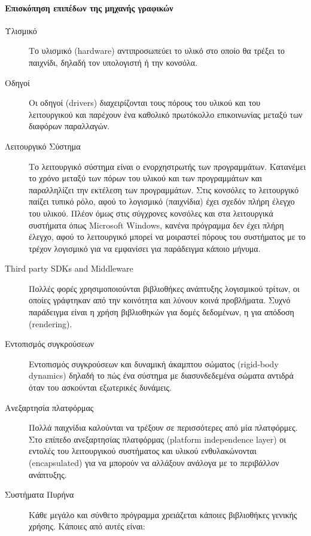 \paragraph{Επισκόπηση επιπέδων της μηχανής γραφικών}
\begin{description}	
\item [Υλισμικό]Το υλισμικό (hardware) αντιπροσωπεύει το υλικό στο οποίο θα τρέξει το παιχνίδι, δηλαδή τον υπολογιστή ή την κονσόλα.

\item [Οδηγοί]Οι οδηγοί (drivers) διαχειρίζονται τους πόρους του υλικού και του λειτουργικού και παρέχουν ένα καθολικό πρωτόκολλο επικοινωνίας μεταξύ των διαφόρων παραλλαγών.

\item [Λειτουργικό Σύστημα]Το λειτουργικό σύστημα είναι ο ενορχηστρωτής των προγραμμάτων. Κατανέμει το χρόνο μεταξύ των πόρων του υλικού και των προγραμμάτων και παραλληλίζει την εκτέλεση των προγραμμάτων. Στις κονσόλες το λειτουργικό παίζει τυπικό ρόλο, αφού το λογισμικό (παιχνίδια) έχει σχεδόν πλήρη έλεγχο του υλικού. Πλέον όμως στις σύγχρονες κονσόλες και στα λειτουργικά συστήματα όπως Microsoft Windows, κανένα πρόγραμμα δεν έχει πλήρη έλεγχο, αφού το λειτουργικό μπορεί να μοιραστεί πόρους του συστήματος με το τρέχον λογισμικό για να εμφανίσει για παράδειγμα κάποιο μήνυμα.

\item [Third party SDKs and Middleware]Πολλές φορές χρησιμοποιούνται βιβλιοθήκες ανάπτυξης λογισμικού τρίτων, οι οποίες γράφτηκαν από την κοινότητα και λύνουν κοινά προβλήματα. Συχνό παράδειγμα είναι η χρήση βιβλιοθηκών για δομές δεδομένων, η για απόδοση (rendering).

\item [Εντοπισμός συγκρούσεων]Εντοπισμός συγκρούσεων και δυναμική άκαμπτου σώματος (rigid-body dynamics) δηλαδή το πώς ένα σύστημα με διασυνδεδεμένα σώματα αντιδρά όταν του ασκούνται εξωτερικές δυνάμεις.

\item [Ανεξαρτησία πλατφόρμας]Πολλά παιχνίδια καλούνται να τρέξουν σε περισσότερες από μία πλατφόρμες. Στο επίπεδο ανεξαρτησίας πλατφόρμας (platform independence layer) οι εντολές του λειτουργικού συστήματος  και υλικού ενθυλακώνονται (encapsulated) για να μπορούν να αλλάξουν ανάλογα με το περιβάλλον ανάπτυξης.

\item [Συστήματα Πυρήνα]Κάθε μεγάλο και σύνθετο πρόγραμμα χρειάζεται κάποιες βιβλιοθήκες γενικής χρήσης. Κάποιες από αυτές είναι: 


\end{description}
